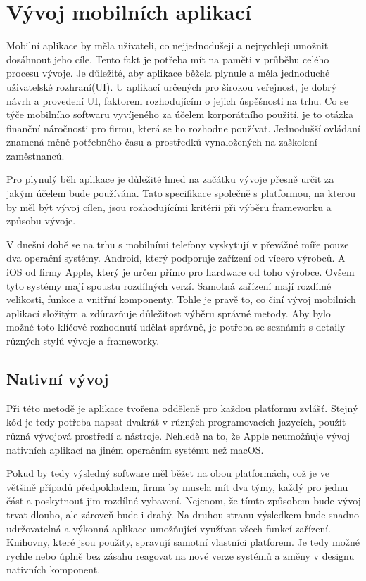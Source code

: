 \documentclass[
  glossaries,
]{kidiplom}
\begin{document}
\section{Vývoj mobilních aplikací}
Mobilní aplikace by měla uživateli, co nejjednodušeji a nejrychleji umožnit dosáhnout jeho cíle. Tento fakt je potřeba mít na paměti v průběhu celého procesu vývoje. Je důležité, aby aplikace běžela plynule a měla jednoduché uživatelské rozhraní(UI). U aplikací určených pro širokou veřejnost, je dobrý návrh a provedení UI, faktorem rozhodujícím o jejich úspěšnosti na trhu. Co se týče mobilního softwaru vyvíjeného za účelem korporátního použití, je to otázka finanční náročnosti pro firmu, která se ho rozhodne používat. Jednodušší ovládaní znamená měně potřebného času a prostředků vynaložených na zaškolení zaměstnanců.

Pro plynulý běh aplikace je důležité hned na začátku vývoje přesně určit
 za jakým účelem bude používána. Tato specifikace společně s platformou, 
 na kterou by měl být vývoj cílen, jsou rozhodujícími kritérii při výběru frameworku a způsobu vývoje.

V dnešní době se na trhu s mobilními telefony vyskytují v převážné míře pouze dva operační systémy. Android, který podporuje zařízení od vícero výrobců. A iOS od firmy Apple, který je určen přímo pro hardware od toho výrobce. Ovšem tyto systémy mají spoustu rozdílných verzí. Samotná zařízení mají rozdílné velikosti, funkce a vnitřní komponenty. Tohle je pravě to, co činí vývoj mobilních aplikací složitým a zdůrazňuje důležitost výběru správné metody. Aby bylo možné toto klíčové rozhodnutí udělat správně, je potřeba se seznámit s detaily různých stylů vývoje a frameworky.

\subsection{Nativní vývoj}
Při této metodě je aplikace tvořena odděleně pro každou platformu zvlášť. Stejný kód je tedy potřeba napsat dvakrát v různých programovacích jazycích, použít různá vývojová prostředí a nástroje. Nehledě na to, že Apple neumožňuje vývoj nativních aplikací na jiném operačním systému než macOS. 

Pokud by tedy výsledný software měl běžet na obou platformách, což je ve většině případů předpokladem, firma by musela mít dva týmy, každý pro jednu část a poskytnout jim rozdílné vybavení. Nejenom, že tímto způsobem bude vývoj trvat dlouho, ale zároveň bude i drahý. Na druhou stranu výsledkem bude snadno udržovatelná a výkonná aplikace umožňující využívat všech funkcí zařízení. Knihovny, které jsou použity, spravují samotní vlastníci platforem. Je tedy možné rychle nebo úplně bez zásahu reagovat na nové verze systémů a změny v designu nativních komponent. 
\end{document}
